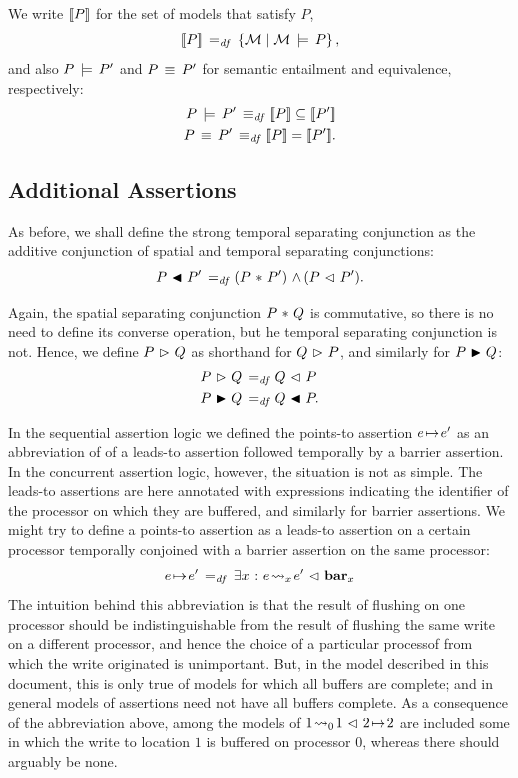 \documentclass[11pt]{report}
\begin{document}
We write $[\![P]\!]$ for the set of models that satisfy $P$,\[ [\![P]\!] \operatorname{\;=_{\mathit{df}}\;} \left\lbrace \mathcal{M} \mid \mathcal{M} \,\models\, P \right\rbrace,\] and also $P \,\models\, P'$ and $P \,\equiv\, P'$ for semantic entailment and equivalence, respectively: \begin{align*}
	P \sentails P' \iffdef \pred{P} \subseteq \pred{P'} \\
	P \sequiv P' \iffdef \pred{P} = \pred{P'}.
\end{align*} 


\subsection{Additional Assertions} 

As before, we shall define the strong temporal separating conjunction as the additive conjunction of spatial and temporal separating conjunctions: \[ P \operatorname{\,\blacktriangleleft\,} P' \operatorname{\;=_{\mathit{df}}\;} (P \operatorname{\,\ast\,} P') \operatorname{\,\wedge\,} (P \operatorname{\,\vartriangleleft\,} P').\]

Again, the spatial separating conjunction $P \operatorname{\,\ast\,} Q$ is commutative, so there is no need to define its converse operation, but he temporal separating conjunction is not. Hence, we define $P \operatorname{\,\vartriangleright\,} Q$ as shorthand for $Q \operatorname{\,\vartriangleright\,} P$, and similarly for $P \operatorname{\,\blacktriangleright\,} Q$: \begin{align*}
  P \operatorname{\,\vartriangleright\,} Q \operatorname{\;=_{\mathit{df}}\;} & Q \operatorname{\,\vartriangleleft\,} P \\ 
  P \operatorname{\,\blacktriangleright\,} Q \operatorname{\;=_{\mathit{df}}\;} & Q \operatorname{\,\blacktriangleleft\,} P. \\ 
\end{align*}

In the sequential assertion logic we defined the points-to assertion $e \!\mapsto\! e'$ as an abbreviation of of a leads-to assertion followed temporally by a barrier assertion. In the concurrent assertion logic, however, the situation is not as simple. The leads-to assertions are here annotated with expressions indicating the identifier of the processor on which they are buffered, and similarly for barrier assertions. We might try to define a points-to assertion as a leads-to assertion on a certain processor temporally conjoined with a barrier assertion on the same processor: \[
  e \!\mapsto\! e' \operatorname{\;=_{\mathit{df}}\;} \exists x \operatorname{\,:\,} e \!\leadsto_{x}\! e' \operatorname{\,\vartriangleleft\,} \mathbf{bar}_{x}
\] The intuition behind this abbreviation is that the result of flushing on one processor should be indistinguishable from the result of flushing the same write on a different processor, and hence the choice of a particular processof from which the write originated is unimportant. But, in the model described in this document, this is only true of models for which all buffers are complete; and in general models of assertions need not have all buffers complete. As a consequence of the abbreviation above, among the models of $1 \!\leadsto_{0}\! 1 \operatorname{\,\vartriangleleft\,} 2 \!\mapsto\! 2$ are included some in which the write to location $1$ is buffered on processor 0, whereas there should arguably be none. 
\end{document}
